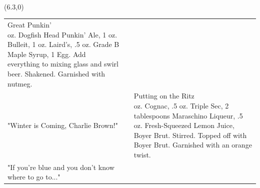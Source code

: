 \documentclass{article}
\makeatletter
\newcommand \Dotfill {\leavevmode \cleaders \hb@xt@ .25em{\hss .\hss }\hfill \kern \z@}%
\makeatother
\begin{document}
{\begin{tabular}{m{}m{}m{}}
\end{tabular}
\\\makebox[\columnwidth]{\Huge\Dotfill}
\begin{textblock}{1}(6.3,0)\rotatebox{90}{\makebox[.25\paperheight]{\Huge\Dotfill}}\end{textblock}
\begin{tabular}{m{}m{}m{}}
{\centering\Huge{Great Punkin'}\\*}
\centering 2 oz. Dogfish Head Punkin' Ale, 1 oz. Bulleit, 1 oz. Laird's, .5 oz. Grade B Maple Syrup, 1 Egg. Add everything to mixing glass and swirl beer. Shakened. Garnished with nutmeg.\\
\centering\small{"Winter is Coming, Charlie Brown!"}
&
&
{\centering\Huge{Putting on the Ritz}\\*}
\centering 1 oz. Cognac, .5 oz. Triple Sec, 2 tablespoons Maraschino Liqueur, .5 oz. Fresh-Squeezed Lemon Juice, Boyer Brut. Stirred. Topped off with Boyer Brut. Garnished with an orange twist.\\
\centering\small{"If you're blue and you don't know where to go to..."}
\end{tabular}
\\\makebox[\columnwidth]{\Huge\Dotfill}

\marginnote{\begin{sideways}\Huge \end{sideways}}

}
\end{document}
